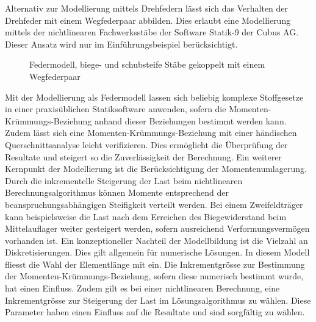 \documentclass[
  11pt,
  letterpaper,
]{scrreprt}
\begin{document}
Alternativ zur Modellierung mittels Drehfedern lässt sich das Verhalten
der Drehfeder mit einem Wegfederpaar abbilden. Dies erlaubt eine
Modellierung mittels der nichtlinearen Fachwerksstäbe der Software
Statik-9 der Cubus AG. Dieser Ansatz wird nur im Einführungsbeispiel
berücksichtigt.

\begin{figure}[H]


\caption{\label{fig-modell_wegfeder}Federmodell, biege- und schubsteife
Stäbe gekoppelt mit einem Wegfederpaar}

\end{figure}%

Mit der Modellierung als Federmodell lassen sich beliebig komplexe
Stoffgesetze in einer praxisüblichen Statiksoftware anwenden, sofern die
Momenten-Krümmungs-Beziehung anhand dieser Beziehungen bestimmt werden
kann. Zudem lässt sich eine Momenten-Krümmungs-Beziehung mit einer
händischen Querschnittsanalyse leicht verifizieren. Dies ermöglicht die
Überprüfung der Resultate und steigert so die Zuverlässigkeit der
Berechnung. Ein weiterer Kernpunkt der Modellierung ist die
Berücksichtigung der Momentenumlagerung. Durch die inkrementelle
Steigerung der Last beim nichtlinearen Berechnungsalgorithmus können
Momente entsprechend der beanspruchungsabhängigen Steifigkeit verteilt
werden. Bei einem Zweifeldträger kann beispielsweise die Last nach dem
Erreichen des Biegewiderstand beim Mittelauflager weiter gesteigert
werden, sofern ausreichend Verformungsvermögen vorhanden ist. Ein
konzeptioneller Nachteil der Modellbildung ist die Vielzahl an
Diskretisierungen. Dies gilt allgemein für numerische Lösungen. In
diesem Modell fliesst die Wahl der Elementlänge mit ein. Die
Inkrementgrösse zur Bestimmung der Momenten-Krümmungs-Beziehung, sofern
diese numerisch bestimmt wurde, hat einen Einfluss. Zudem gilt es bei
einer nichtlinearen Berechnung, eine Inkrementgrösse zur Steigerung der
Last im Lösungsalgorithmus zu wählen. Diese Parameter haben einen
Einfluss auf die Resultate und sind sorgfältig zu wählen.
\end{document}
